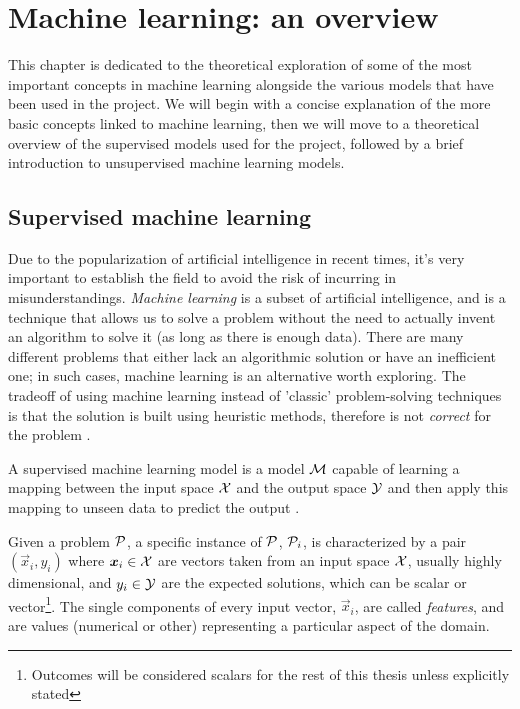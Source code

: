 \chapter{Machine learning: an overview}
\label{chp:ml}
This chapter is dedicated to the theoretical exploration of some of the most important concepts in
machine learning alongside the various models that have been used in the project. We will begin with
a concise explanation of the more basic concepts linked to machine learning, then we will move to a
theoretical overview of the supervised models used for the project, followed by a brief introduction to
unsupervised machine learning models.

\section{Supervised machine learning}
\label{sec:sml}
Due to the popularization of artificial intelligence in recent times, it's very important to establish the field to avoid the risk of
incurring in misunderstandings. \emph{Machine learning} is a subset of artificial
intelligence, and is a technique that allows us to solve a problem without the need to actually invent an
algorithm to solve it (as long as there is enough data). There are many different problems that
either lack an algorithmic solution or have an inefficient one; in such cases, machine learning is
an alternative worth exploring. The tradeoff of using machine learning instead of 'classic'
problem-solving techniques is that the solution is built using heuristic methods,
therefore is not \emph{correct} for the problem \cite{Rebala2019}.

\medskip

A supervised machine learning model is a model $\mathcal{M}$ capable of learning a mapping between the
input space $\mathcal{X}$ and the output space $\mathcal{Y}$ and then apply this mapping to unseen
data to predict the output \cite{Cunningham2008}.

\smallskip

Given a problem $\mathcal{P}$, a specific instance of $\mathcal{P}$, $\mathcal{P}_i$, is characterized by a pair
$(\vec{x}_i, y_i)$ where $\boldsymbol{x}_i \in \mathcal{X}$ are vectors taken from an input space $\mathcal{X}$, usually
highly dimensional, and $y_i \in \mathcal{Y}$ are the expected solutions, which can be scalar or
vector\footnote{Outcomes will be considered scalars for the rest of this thesis unless explicitly
	stated}. The single components of every input vector, $\vec{x}_i$, are called
\emph{features}, and are values (numerical or other) representing a particular aspect of the domain.

